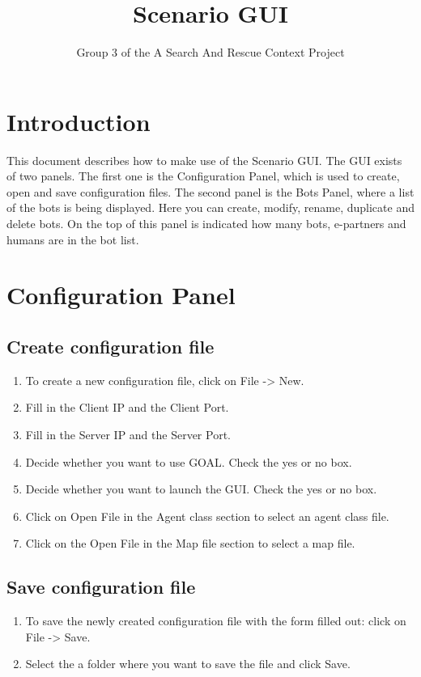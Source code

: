 \documentclass[a4paper]{article}
\title{Scenario GUI}
\author{Group 3 of the A Search And Rescue Context Project}
\date{}
\begin{document}
\maketitle
\newpage

\tableofcontents
\newpage

\section{Introduction}
This document describes how to make use of the Scenario GUI. The GUI exists of two panels. The first one is the Configuration Panel, which is used to create, open and save configuration files. The second panel is the Bots Panel, where a list of the bots is being displayed. Here you can create, modify, rename, duplicate and delete bots. On the top of this panel is indicated how many bots, e-partners and humans are in the bot list.

\section{Configuration Panel}
\subsection{Create configuration file}
\begin{enumerate}
	\item To create a new configuration file, click on File -> New.
	\item Fill in the Client IP and the Client Port.
	\item Fill in the Server IP and the Server Port.
	\item Decide whether you want to use GOAL. Check the yes or no box.
	\item Decide whether you want to launch the GUI. Check the yes or no box.
	\item Click on Open File in the Agent class section to select an agent class file.
	\item Click on the Open File in the Map file section to select a map file.
\end{enumerate}

\subsection{Save configuration file}
\begin{enumerate}
	\item To save the newly created configuration file with the form filled out: click on File -> Save.
	\item Select the a folder where you want to save the file and click Save.
\end{enumerate}
\end{document}

